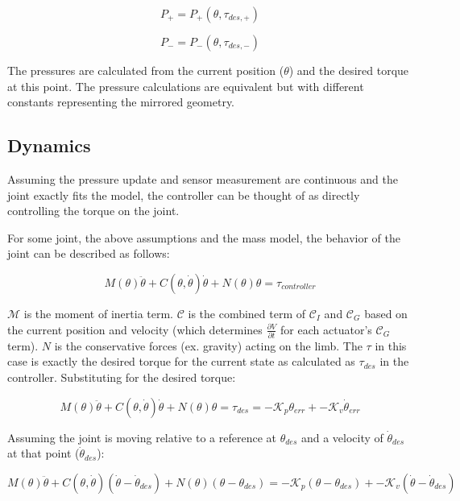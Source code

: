 \documentclass[12pt, letterpaper, oneside, notitlepage, onecolumn]{article}
\newcommand{\bbss}[1]{\subsection{#1}}
\begin{document}
\begin{equation}
P_{+} = P_{+}(\theta, \tau_{des, +})
\end{equation}

\begin{equation}
P_{-} = P_{-}(\theta, \tau_{des, -})
\end{equation}

The pressures are calculated from the current position ($\theta$) and the
desired torque at this point. The pressure calculations are equivalent but with
different constants representing the mirrored geometry.

\bbss{Dynamics}

Assuming the pressure update and sensor measurement are continuous and the joint
exactly fits the model, the controller can be thought of as directly controlling
the torque on the joint. 

For some joint, the above assumptions and the mass model, the behavior of the
joint can be described as follows:

\begin{equation}
M(\theta) \ddot{\theta} + C(\theta, \dot{\theta}) \dot{\theta} + N(\theta) \theta = 
\tau_{controller}
\end{equation}

$\mathcal{M}$ is the moment of inertia term. $\mathcal{C}$ is the combined term
of $\mathcal{C}_{I}$ and $\mathcal{C}_{G}$ based on the current position and
velocity (which determines $\frac{\partial V}{\partial t}$ for each actuator's
$\mathcal{C}_{G}$ term). $N$ is the conservative forces (ex. gravity) acting on
the limb. The $\tau$ in this case is exactly the desired torque for the current
state as calculated as $\tau_{des}$ in the controller. Substituting for the
desired torque:

\begin{equation}
M(\theta) \ddot{\theta} + C(\theta, \dot{\theta}) \dot{\theta} + N(\theta) \theta = 
\tau_{des} = -\mathcal{K}_{p} \theta_{err} + -\mathcal{K}_{v} \dot{\theta}_{err}
\end{equation}

Assuming the joint is moving relative to a reference at $\theta_{des}$ and a
velocity of $\dot{\theta}_{des}$ at that point ($\dot{\theta}_{des}$):

\begin{equation}
M(\theta) \ddot{\theta}
+ C(\theta, \dot{\theta}) (\dot{\theta} - \dot{\theta}_{des}) 
+ N(\theta)(\theta - \theta_{des}) = 
-\mathcal{K}_{p} (\theta - \theta_{des})
+ -\mathcal{K}_{v} (\dot{\theta} - \dot{\theta}_{des})
\end{equation}
\end{document}
